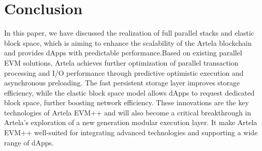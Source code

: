 \section{Conclusion}

In this paper, we have discussed the realization of full parallel stacks and elastic block space, which is aiming to enhance the scalability of the Artela blockchain and provides dApps with predictable performance.Based on existing parallel EVM solutions, Artela achieves further optimization of parallel transaction processing and I/O performance through predictive optimistic execution and asynchronous preloading. The fast persistent storage layer improves storage efficiency, while the elastic block space model allows dApps to request dedicated block space, further boosting network efficiency. These innovations are the key technologies of Artela EVM++ and will also become a critical breakthrough in Artela's exploration of a new generation modular execution layer. It make Artela EVM++ well-suited for integrating advanced technologies and supporting a wide range of dApps.
